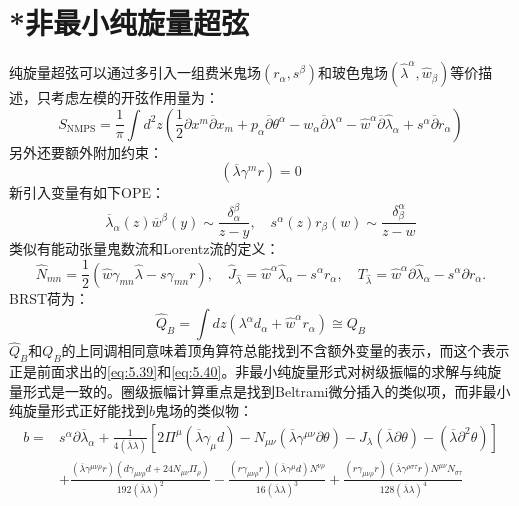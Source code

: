\section{*非最小纯旋量超弦}
纯旋量超弦可以通过多引入一组费米鬼场$(r_\alpha,s^\beta)$和玻色鬼场$(\hat\lambda^\alpha,\hat w_\beta)$等价描述，只考虑左模的开弦作用量为：\cite{Berkovits:2005bt}
\begin{equation}
	S_{\mathrm{NMPS}}=\frac{1}{\pi}\int d^2z(\frac{1}{2}\partial x^m\overline{\partial}x_m+p_\alpha\overline{\partial}\theta^\alpha-w_\alpha\overline{\partial}\lambda^\alpha-\hat{w}^\alpha\overline{\partial}\hat{\lambda}_\alpha+s^\alpha\overline{\partial}r_\alpha)
\end{equation}
另外还要额外附加约束：
\begin{equation}
	(\overline{\lambda}\gamma^mr)=0
\end{equation}
新引入变量有如下OPE：
\begin{equation}
	\overline{\lambda}_\alpha(z)\overline{w}^\beta(y)\sim\frac{\delta_\alpha^\beta}{z-y},\quad s^\alpha(z)r_\beta(w)\sim\frac{\delta_\beta^\alpha}{z-w}
\end{equation}
类似有能动张量鬼数流和Lorentz流的定义：
\begin{equation}
		\hat{N}_{mn} = \frac{1}{2} \left( \hat{w} \gamma_{mn} \hat{\lambda} - s \gamma_{mn} r \right), \quad
		\hat{J}_{\hat{\lambda}} = \hat{w}^\alpha \hat{\lambda}_\alpha - s^\alpha r_\alpha, \quad 
		T_{\hat{\lambda}} = \hat{w}^\alpha \partial \hat{\lambda}_\alpha - s^\alpha \partial r_\alpha.
\end{equation}
BRST荷为：
\begin{equation}
	\hat Q_B=\int dz(\lambda^\alpha d_\alpha+\hat{w}^\alpha r_\alpha)\cong Q_B
\end{equation}
$\hat Q_B$和$Q_B$的上同调相同意味着顶角算符总能找到不含额外变量的表示，而这个表示正是前面求出的\ref{eq:5.39}和\ref{eq:5.40}。非最小纯旋量形式对树级振幅的求解与纯旋量形式是一致的。圈级振幅计算重点是找到Beltrami微分插入的类似项，而非最小纯旋量形式正好能找到$b$鬼场的类似物：
\begin{equation}
	\label{eq:5.94}
	\begin{aligned}
		b =&  s^\alpha \partial \overline{\lambda}_\alpha + \frac{1}{4(\overline{\lambda}\lambda)} \left[ 2\Pi^\mu (\overline{\lambda}\gamma_\mu d) - N_{\mu\nu} (\overline{\lambda}\gamma^{\mu\nu} \partial\theta) - J_\lambda (\overline{\lambda}\partial\theta) - (\overline{\lambda}\partial^2\theta) \right] \\
		&+ \frac{(\overline{\lambda}\gamma^{\mu\nu\rho} r)(d\gamma_{\mu\nu\rho}d + 24N_{\mu\nu}\Pi_\rho)}{192(\overline{\lambda}\lambda)^2} - \frac{(r\gamma_{\mu\nu\rho}r)(\overline{\lambda}\gamma^\mu d)N^{\nu\rho}}{16(\overline{\lambda}\lambda)^3} 
		+ \frac{(r\gamma_{\mu\nu\rho}r)(\overline{\lambda}\gamma^{\rho\sigma\tau}r)N^{\mu\nu}N_{\sigma\tau}}{128(\overline{\lambda}\lambda)^4}
	\end{aligned}
\end{equation}
